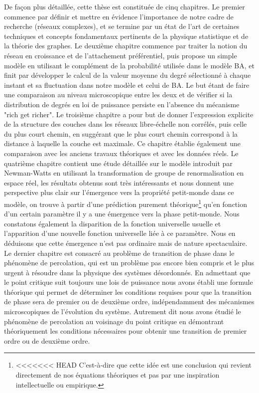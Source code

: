 De façon plus détaillée, cette thèse est constituée de cinq chapitres. Le premier commence par définir et mettre en évidence l'importance de notre cadre de recherche (réseaux complexes), et se termine par un état de l'art de  certaines techniques et concepts fondamentaux pertinents de la physique statistique et de la théorie des graphes. Le deuxième chapitre commence par traiter la notion du réseau en croissance et de l'attachement préférentiel, puis propose un simple modèle en utilisant le complément de la probabilité utilisée dans le modèle BA, et finit par développer le calcul de la valeur moyenne du degré sélectionné à chaque instant et sa fluctuation dans notre modèle et celui de BA. Le but étant de faire une comparaison au niveau microscopique entre les deux et de vérifier si la distribution de degrés en loi de puissance persiste en l'absence du mécanisme "rich get richer". Le troisième chapitre a pour but de donner l'expression explicite de la structure des couches dans les réseaux libre-échelle non corrélés, puis celle du plus court chemin, en suggérant que le plus court chemin correspond à la distance à laquelle la couche est maximale. Ce chapitre établie également une comparaison avec les anciens travaux théoriques et avec les données réels. Le quatrième chapitre contient une étude détaillée sur le modèle introduit par Newman-Watts en utilisant la transformation de groupe de renormalisation en espace réel, les résultats obtenus sont très intéressants et nous donnent une  perspective plus clair sur l'émergence vers la propriété petit-monde dans ce modèle, on trouve à partir d'une prédiction purement théorique\footnote{ 
<<<<<<< HEAD
C'est-à-dire que cette idée est une conclusion qui revient directement de nos équations théoriques et pas par une inspiration intellectuelle ou empirique.} qu'en fonction d'un certain paramètre il y a une émergence vers la phase petit-monde. Nous constatons également la disparition de la fonction universelle usuelle   et l'apparition d'une nouvelle fonction universelle liée à ce paramètre. Nous en déduisons que cette émergence n'est pas ordinaire mais de nature spectaculaire. Le dernier chapitre est consacré au problème de transition de phase dans le phénomène de percolation,  qui est un problème pas encore bien compris et le plus urgent à résoudre dans la physique des systèmes désordonnés. En admettant que le point critique suit toujours une lois de puissance nous avons établi une formule théorique qui permet de déterminer les conditions requises pour que la transition de phase sera de premier ou de deuxième ordre, indépendamment des mécanismes microscopiques de l'évolution du système. Autrement dit nous avons étudié le phénomène de percolation au voisinage du point critique en démontrant théoriquement les conditions nécessaires pour obtenir une transition de premier ordre ou de deuxième ordre.\\
